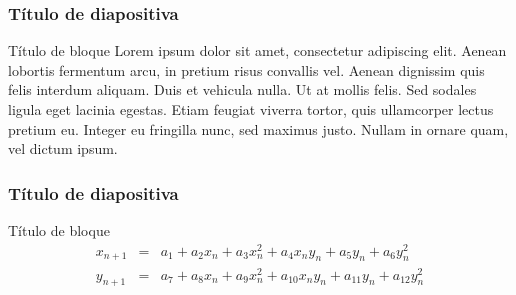\documentclass[10pt]{beamer}
\begin{document}
\begin{frame}
    \frametitle{Título de diapositiva}
    \begin{block}{Título de bloque}
        \justifying
        Lorem ipsum dolor sit amet, consectetur adipiscing elit. Aenean lobortis fermentum arcu, in pretium risus convallis vel. Aenean dignissim quis felis interdum aliquam. Duis et vehicula nulla. Ut at mollis felis. Sed sodales ligula eget lacinia egestas. Etiam feugiat viverra tortor, quis ullamcorper lectus pretium eu. Integer eu fringilla nunc, sed maximus justo. Nullam in ornare quam, vel dictum ipsum.
	\end{block}
\end{frame}

\begin{frame}
    \frametitle{Título de diapositiva}
    \begin{block}{Título de bloque}
        \justifying
        \begin{equation}
        \begin{array}{ccl}
		    x_{n+1} & = &  a_{1} + a_{2}x_{n} + a_{3}x_{n}^{2} + a_{4}x_{n}y_{n} + a_{5}y_{n} + a_{6}y_{n}^{2}\\
		    y_{n+1} & = &  a_{7} + a_{8}x_{n} + a_{9}x_{n}^{2} + a_{10}x_{n}y_{n} + a_{11}y_{n} + a_{12}y_{n}^{2}
		\end{array}
	    \end{equation}
	\end{block}
\end{frame}
\end{document}
